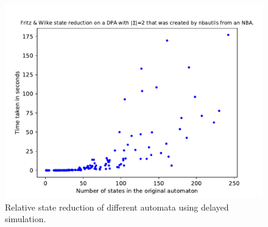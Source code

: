 \begin{figure}
\begin{minipage}{0.49\textwidth}
		\includegraphics[page=2,height=.3\textheight]{../data/analysis/fritzwilke/detnbaut_ap1.pdf} 
		\caption{Relative state reduction of different automata using delayed simulation.}
		\label{exp:fig:fritzwilke_reduct_abs}
	\end{minipage}
\end{figure}


